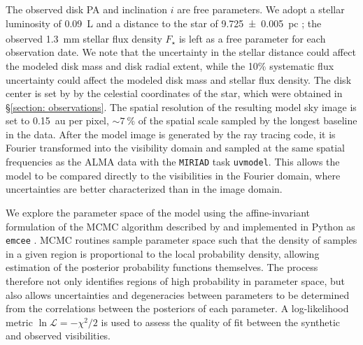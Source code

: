 \documentclass[modern]{aastex62}
\begin{document}
The observed disk PA and inclination $i$ are free parameters.
We adopt a stellar luminosity of \SI{0.09}{L_\sun} \citep{plavchan09} and a distance to the star of \SI{9.725 \pm 0.005}{pc}
\citep{gaia_DR2}; the observed \SI{1.3}{mm} stellar flux density $F_\star$ is left as a free parameter for each observation date.
We note that the uncertainty in the stellar distance could affect the modeled disk mass and disk radial extent, while the 10\% systematic flux uncertainty could affect the modeled disk mass and stellar flux density.
The disk center is set by by the celestial coordinates of the star, which were obtained in \S \ref{section: observations}.
The spatial resolution of the resulting model sky image is set to \SI{0.15}{au} per pixel, $\sim \SI{7}{\percent}$ of the spatial scale sampled by the longest baseline in the data. 
After the model image is generated by the ray tracing code, it is Fourier transformed into the visibility domain and sampled at the same spatial frequencies as the ALMA data with the \texttt{MIRIAD} task \texttt{uvmodel}.
This allows the model to be compared directly to the visibilities in the Fourier domain, where uncertainties are better characterized than in the image domain.

We explore the parameter space of the model using the affine-invariant formulation of the MCMC algorithm described by \citet{goodmanweare10} and implemented in Python as \texttt{emcee} \citep{foreman-mackey13}.  
MCMC routines sample parameter space such that the density of samples in a given region is proportional to the local probability density, allowing estimation of the posterior probability functions themselves.
The process therefore not only identifies regions of high probability in parameter space, but also allows uncertainties and degeneracies between parameters to be determined from the correlations between the posteriors of each parameter. 
A log-likelihood metric $\ln \mathcal{L} = -\chi^2 / 2$ is used to assess the quality of fit between the synthetic and observed visibilities.
\end{document}
